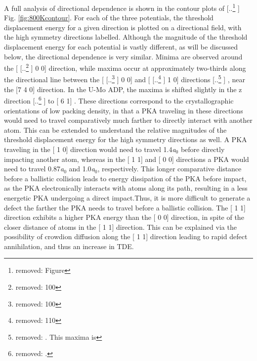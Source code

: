 \documentclass[review]{elsarticle}
\providecommand{\DIFaddtex}[1]{{\protect\color{blue} \sf #1}} %
\providecommand{\DIFdeltex}[1]{{\protect\color{red} [..\footnote{removed: #1} ]}} %
\providecommand{\DIFaddbegin}{} %
\providecommand{\DIFaddend}{} %
\providecommand{\DIFdelbegin}{} %
\providecommand{\DIFdelend}{} %
\providecommand{\DIFadd}[1]{\texorpdfstring{\DIFaddtex{#1}}{#1}} %
\providecommand{\DIFdel}[1]{\texorpdfstring{\DIFdeltex{#1}}{}} %
\newcommand{\DIFscaledelfig}{0.5}
\newlength{\DIFdelgraphicswidth} %
\newlength{\DIFdelgraphicsheight} %
\newcommand{\DIFaddincludegraphics}[2][]{{\color{blue}\fbox{\DIFOincludegraphics[#1]{#2}}}} %
\newcommand{\DIFdelincludegraphics}[2][]{%
\sbox{\DIFdelgraphicsbox}{\DIFOincludegraphics[#1]{#2}}%
\settoboxwidth{\DIFdelgraphicswidth}{\DIFdelgraphicsbox} %
\settoboxtotalheight{\DIFdelgraphicsheight}{\DIFdelgraphicsbox} %
\scalebox{\DIFscaledelfig}{%
\parbox[b]{\DIFdelgraphicswidth}{\usebox{\DIFdelgraphicsbox}\\[-\baselineskip] \rule{\DIFdelgraphicswidth}{0em}}\llap{\resizebox{\DIFdelgraphicswidth}{\DIFdelgraphicsheight}{%
\setlength{\unitlength}{\DIFdelgraphicswidth}%
\begin{picture}(1,1)%
\thicklines\linethickness{2pt} %
{\color[rgb]{1,0,0}\put(0,0){\framebox(1,1){}}}%
{\color[rgb]{1,0,0}\put(0,0){\line( 1,1){1}}}%
{\color[rgb]{1,0,0}\put(0,1){\line(1,-1){1}}}%
\end{picture}%
}\hspace*{3pt}}} %
} %
\DeclareRobustCommand{\DIFaddbegin}{\DIFOaddbegin \let\includegraphics\DIFaddincludegraphics} %
\DeclareRobustCommand{\DIFaddend}{\DIFOaddend \let\includegraphics\DIFOincludegraphics} %
\DeclareRobustCommand{\DIFdelbegin}{\DIFOdelbegin \let\includegraphics\DIFdelincludegraphics} %
\DeclareRobustCommand{\DIFdelend}{\DIFOaddend \let\includegraphics\DIFOincludegraphics} %
\begin{document}
\FloatBarrier

A full analysis of directional dependence is shown in the contour plots of \DIFdelbegin \DIFdel{Figure }\DIFdelend \DIFaddbegin \DIFadd{Fig. }\DIFaddend \ref{fig:800Kcontour}. For each of the three potentials, the \DIFaddbegin \DIFadd{threshold }\DIFaddend displacement energy for a given direction is plotted on a directional field, with the high symmetry directions labelled. Although the magnitude of the threshold displacement energy for each potential is vastly different, as will be discussed below, the directional dependence is very similar. Minima are observed around the [\DIFdelbegin \DIFdel{100}\DIFdelend \DIFaddbegin \DIFadd{1 0 0}\DIFaddend ] direction, while maxima occur at approximately two-thirds along the directional line between the [\DIFdelbegin \DIFdel{100}\DIFdelend \DIFaddbegin \DIFadd{1 0 0}\DIFaddend ] and [\DIFdelbegin \DIFdel{110}\DIFdelend \DIFaddbegin \DIFadd{1 1 0}\DIFaddend ] directions\DIFdelbegin \DIFdel{. This maxima is }\DIFdelend \DIFaddbegin \DIFadd{, }\DIFaddend near the [7 4 0] direction. In the U-Mo ADP, the maxima is shifted slightly in the z direction \DIFdelbegin \DIFdel{. 
}\DIFdelend \DIFaddbegin \DIFadd{to }[\DIFadd{13 6 1}]\DIFadd{. These directions correspond to the crystallographic orientations of low packing density, in that a PKA traveling in these directions would need to travel comparatively much farther to directly interact with another atom. This can be extended to understand the relative magnitudes of the threshold displacement energy for the high symmetry directions as well. A PKA traveling in the }[\DIFadd{1 1 0}] \DIFadd{direction would need to travel 1.4\textit{a$_{0}$} before directly impacting another atom, whereas in the }[\DIFadd{1 1 1}] \DIFadd{and }[\DIFadd{1 0 0}] \DIFadd{directions a PKA would need to travel 0.87\textit{a$_{0}$} and 1.0\textit{a$_{0}$}, respectively. This longer comparative distance before a ballistic collision leads to energy dissipation of the PKA before impact, as the PKA electronically interacts with atoms along its path, resulting in a less energetic PKA undergoing a direct impact.Thus, it is more difficult to generate a defect the farther the PKA needs to travel before a ballistic collision. The }[\DIFadd{1 1 1}] \DIFadd{direction exhibits a higher PKA energy than the }[\DIFadd{1 0 0}] \DIFadd{direction, in spite of the closer distance of atoms in the }[\DIFadd{1 1 1}] \DIFadd{direction. This can be explained via the possibility of crowdion diffusion along the }[\DIFadd{1 1 1}] \DIFadd{direction leading to rapid defect annihilation, and thus an increase in TDE. 
}\DIFaddend 
\end{document}
